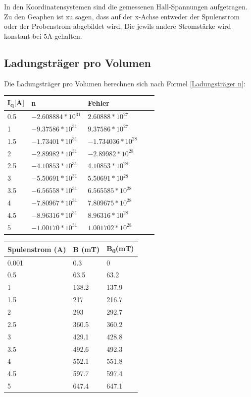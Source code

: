 \documentclass[titlepage=firstcover, captions=tableheading]{scrartcl}
\begin{document}
In den Koordinatensystemen sind die gemessenen Hall-Spannungen aufgetragen.
Zu den Geaphen ist zu sagen, dass auf der x-Achse entweder der Spulenstrom oder der Probenstrom abgebildet wird.
Die jewils andere Stromstärke wird konstant bei 5A gehalten.

\subsection{Ladungsträger pro Volumen}
Die Ladungsträger pro Volumen berechnen sich nach Formel \ref{Ladungsträger n}:
\begin{center}
    \begin{tabular}{ll@{${}\pm{}$}lll}
        \toprule
        I\textsubscript{q}[A]&n&Fehler \\
        \midrule
        0.5 &$ -2.608884*10^{31}$&$2.60888*10^{27} $\\
        1   &$  -9.37586*10^{31}$&$9.37586*10^{27}$\\
        1.5 &$  -1.73401*10^{31}$&$-1.734036*10^{28}$\\
        2   &$  -2.89982*10^{31}$&$-2.89982*10^{28}$\\
        2.5 &$  -4.10853*10^{31}$&$4.10853*10^{28} $\\
        3   &$  -5.50691*10^{31}$&$5.50691*10^{28} $\\
        3.5 &$  -6.56558*10^{31}$&$6.565585*10^{28}$\\
        4   &$  -7.80967*10^{31}$&$7.809675*10^{28}$\\    
        4.5 &$  -8.96316*10^{31}$&$8.96316*10^{28} $\\
        5   &$  -1.00170*10^{31}$&$1.001702*10^{28}$\\
        \bottomrule
    \end{tabular}
\end{center}

\begin{center}
    \begin{tabular}{lll}
        \toprule
        Spulenstrom (A) & B (mT) & B\textsubscript{0}(mT) \\
        \midrule 
        0.001     &      0.3  &   0\\
        0.5       &      63.5 &   63.2 \\
        1         &      138.2&   137.9\\
        1.5       &      217  &   216.7\\
        2         &      293  &   292.7\\
        2.5       &      360.5&   360.2\\
        3         &      429.1&   428.8\\
        3.5       &      492.6&   492.3\\
        4         &      552.1&   551.8\\
        4.5       &      597.7&   597.4\\
        5         &      647.4&   647.1\\
        \bottomrule
    \end{tabular}
\end{center}
\end{document}
